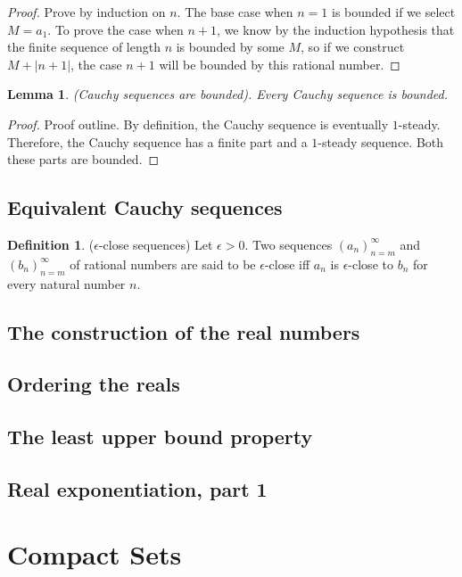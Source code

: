 \documentclass[12pt]{article}
\newtheorem{lemma}[theorem]{Lemma}
\theoremstyle{definition}
\newtheorem{definition}[theorem]{Definition}
\theoremstyle{remark}
\begin{document}
\begin{proof}
    Prove by induction on $n$. The base case when $n = 1$ is bounded if we select $M = a_1$. To prove the case when $n + 1$, we know by the induction hypothesis that the finite sequence of length $n$ is bounded by some $M$, so if we construct $M + |n+1|$, the case $n+1$ will be bounded by this rational number.
\end{proof}

\begin{lemma}
    (Cauchy sequences are bounded). Every Cauchy sequence is bounded.
\end{lemma}

\begin{proof}
    Proof outline. By definition, the Cauchy sequence is eventually $1$-steady. Therefore, the Cauchy sequence has a finite part and a $1$-steady sequence. Both these parts are bounded.
\end{proof}

\subsection{Equivalent Cauchy sequences}

\begin{definition}
    ($\epsilon$-close sequences) Let $\epsilon > 0$. Two sequences $(a_n)_{n=m}^\infty$ and $(b_n)_{n=m}^\infty$ of rational numbers are said to be $\epsilon$-close iff $a_n$ is $\epsilon$-close to $b_n$ for every natural number $n$.
\end{definition}

\subsection{The construction of the real numbers}
\subsection{Ordering the reals}
\subsection{The least upper bound property}
\subsection{Real exponentiation, part 1}

\section{Compact Sets}
\end{document}

